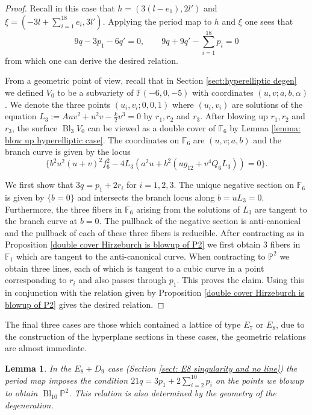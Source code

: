 \documentclass[a4paper]{amsart}
\theoremstyle{definition}
\theoremstyle{plain}
\newtheorem{lemma}[defn]{Lemma}
\theoremstyle{remark}
\newcommand{\PS}{\mathbb{P}}
\newcommand{\F}{\mathbb{F}}
\begin{document}
\begin{proof}
Recall in this case that $h = (3(l-e_1),2l')$ and $\xi=(-3l+\sum_{i=1}^{18}e_i,3l')$. Applying the period map to $h$ and $\xi$ one sees that
$$9q-3p_1-6q'=0, \qquad 9q+9q'-\sum_{i=1}^{18}p_i=0$$
from which one can derive the desired relation.

From a geometric point of view, recall that in Section \ref{sect:hyperelliptic degen} we defined $V_0$ to be a subvariety of $\F(-6,0,-5)$ with coordinates $(u,v;a,b,\alpha)$. We denote the three points $(u_i,v_i;0,0,1)$ where $(u_i,v_i)$ are solutions of the equation $L_3:=Auv^2+u^2v-\frac{k}{2}v^3=0$ by $r_1,r_2$ and $r_3$. After blowing up $r_1,r_2$ and $r_3$, the surface  $\operatorname{Bl}_3V_0$ can be viewed as a double cover of $\F_6$ by Lemma \ref{lemma: blow up hyperelliptic case}. The coordinates on $\F_6$ are $(u,v;a,b)$ and the branch curve is given by the locus $$\{b^2u^2(u+v)^2f_6^2-4L_3(a^2u+b^2(ug_{12}+v^4Q_6L_3))=0\}.$$

We first show that $3q=p_1+2r_i$ for $i=1,2,3$. The unique negative section on $\F_6$ is given by $\{b=0\}$ and intersects the branch locus along $b=uL_3=0$. Furthermore, the three fibers in $\F_6$ arising from the solutions of $L_3$ are tangent to the branch curve at $b=0$. The pullback of the negative section is anti-canonical and the pullback of each of these three fibers is reducible. After contracting as in Proposition \ref{double cover Hirzeburch is blowup of P2} we first obtain 3 fibers in $\F_1$ which are tangent to the anti-canonical curve. When contracting to $\PS^2$ we obtain three lines, each of which is tangent to a cubic curve in a point corresponding to $r_i$ and also passes through $p_1$. This proves the claim. Using this in conjunction with the relation given by Proposition \ref{double cover Hirzeburch is blowup of P2} gives the desired relation.
 \end{proof}
 
The final three cases are those which contained a lattice of type $E_7$ or $E_8$, due to the construction of the hyperplane sections in these cases, the geometric relations are almost immediate.

\begin{lemma}
In the $E_8+D_9$ case (Section \ref{sect: E8 singularity and no line}) the period map imposes the condition $21q = 3p_1+2\sum_{i=2}^{10}p_i$ on the points we blowup to obtain $\operatorname{Bl}_{10}\PS^2$. This relation is also determined by the geometry of the degeneration.
\end{lemma}
\end{document}
